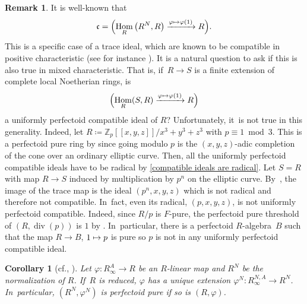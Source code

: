 \documentclass[11pt]{article}
\newcommand{\cf}{cf.\xspace}
\let\autoref\cref
\newcommand\mto{\mathchoice{\longmapsto}{\mapsto}{\mapsto}{\mapsto}}
\theoremstyle{plain}
\newtheorem{corollary}[theorem]{Corollary}
\theoremstyle{definition}
\newtheorem{remark}[theorem]{Remark}
\numberwithin{equation}{theorem}
\newcommand{\Z}{\mathbb {Z}}
\newcommand{\fracc}{\mathfrak{c}}
\DeclareMathOperator{\Div}{{div}}
\DeclareMathOperator{\Hom}{Hom}
\let\Im\relax
\DeclareMathOperator{\Im}{Im}
\newcommand{\llbracket}{[\![}
\newcommand{\rrbracket}{]\!]}
\renewcommand{\phi}{\varphi}
\newcommand{\rafty}{R^A_\infty}
\newcommand{\ranfty}{R^{N,A}_\infty}
\begin{document}
\begin{remark}
It is well-known that
\[\fracc=\Im\Bigl(\Hom_R\left(R^N,R\right)\xrightarrow{\phi\mto \phi(1)} R\Bigr).\]
This is a specific case of a trace ideal, which are known to be compatible in positive characteristic (see for instance \cite[Lem.\,2.2]{PolstraSchwedeCompatibleIdealsGorensteinRings}). It is a natural question to ask if this is also true in mixed characteristic. That is, if~$R\to S$ is a finite extension of complete local Noetherian rings, is
\[\Im\Bigl(\Hom_R(S,R)\xrightarrow{\phi\mto \phi(1)} R\Bigr)\] a uniformly perfectoid compatible ideal of $R$? Unfortunately, it~is not true in this generality. Indeed, let $R\coloneqq \Z_p\llbracket x,y,z\rrbracket/x^3+y^3+z^3$ with $p\equiv 1 \bmod 3$. This is a perfectoid pure ring by \cite[Ex.\,7.3]{BMPSTWWPerfectoidPure} since going modulo $p$ is the $(x,y,z)$-adic completion of the cone over an ordinary elliptic curve. Then, all the uniformly perfectoid compatible ideals have to be radical by \autoref{compatible ideals are radical}. Let $S=R$ with map $R\to S$ induced by multiplication by $p^n$ on the elliptic curve. By~\cite[Ex.\,4.14]{BMPSTWWMinimalModelProgramMixedCharacteristic}, the image of the trace map is the ideal $(p^n,x,y,z)$ which is not radical and therefore not compatible. In~fact, even its radical, $(p,x,y,z)$, is not uniformly perfectoid compatible. Indeed, since $R/p$ is $F$-pure, the perfectoid pure threshold of $(R,\Div(p))$ is $1$ by \cite[Rem.\,2.10]{YoshikawaComputationMethodPerfectoidPurity}. In~particular, there is a perfectoid $R$\nobreakdash-algebra~$B$ such that the map $R\to B$, $1\mto p$ is pure so $p$ is not in any uniformly perfectoid compatible ideal.
\end{remark}

\begin{corollary}[{\cf \cite[Prop.\,7.11]{SchwedeCentersOfFPurity},
\cite[Exer.\,1.2.E\,(4)]{BrionKumarFrobeniusSplitting}}]\label{purity extends to normalization}
Let $\phi\colon \rafty\to R$ be an $R$\nobreakdash-linear map and $R^N$ be the normalization of $R$. If~$R$ is reduced, $\phi$ has a unique extension $\phi^N\colon \ranfty \to R^N$. In~particular, $(R^N,\phi^N)$ is perfectoid pure if so is $(R,\phi)$.
\end{corollary}
\end{document}

